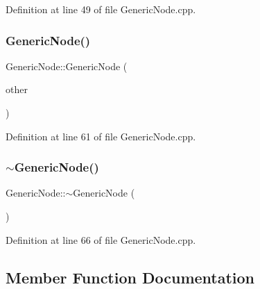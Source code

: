 Definition at line 49 of file Generic\+Node.\+cpp.

\mbox{\label{class_generic_node_a9b0f3cb66385b487944d4f28069546f3}} 
\subsubsection{\texorpdfstring{Generic\+Node()}{GenericNode()}\hspace{0.1cm}{\footnotesize\ttfamily [2/2]}}
{\footnotesize\ttfamily Generic\+Node\+::\+Generic\+Node (\begin{DoxyParamCaption}\item[{const \hyperlink{class_generic_node}{Generic\+Node} \&}]{other }\end{DoxyParamCaption})\hspace{0.3cm}{\ttfamily [protected]}}



Definition at line 61 of file Generic\+Node.\+cpp.

\mbox{\label{class_generic_node_ae97c1f46c781cbf09bfa7054097baa2a}} 
\subsubsection{\texorpdfstring{$\sim$\+Generic\+Node()}{~GenericNode()}}
{\footnotesize\ttfamily Generic\+Node\+::$\sim$\+Generic\+Node (\begin{DoxyParamCaption}{ }\end{DoxyParamCaption})\hspace{0.3cm}{\ttfamily [protected]}}



Definition at line 66 of file Generic\+Node.\+cpp.



\subsection{Member Function Documentation}
\mbox{\label{class_generic_node_a923a359d019dc5a97a3da74aa33e2761}} 
